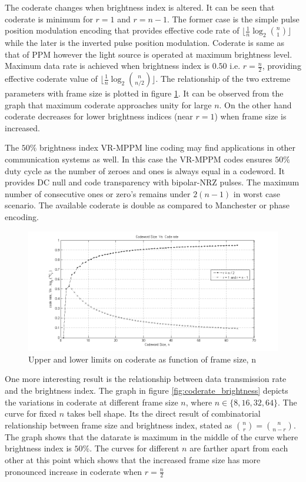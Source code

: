 The coderate changes when brightness index is altered. It can be seen that coderate is minimum for $r=1$ and $r=n-1$. The former case is the simple pulse position modulation encoding that provides effective code rate of $\lfloor \frac{1}{n} \log_2 \binom{n}{1} \rfloor$ while the later is the inverted pulse position modulation. Coderate is same as that of PPM however the light source is operated at maximum brightness level. Maximum data rate is achieved when brightness index is $0.50$ i.e. $r=\frac{n}{2}$, providing effective coderate value of $\lfloor \frac{1}{n} \log_2 \binom{n}{n/2} \rfloor$.  The relationship of the two extreme parameters with frame size is plotted in figure \ref{fig:coderate_limits}. It can be observed from the graph that maximum coderate approaches unity for large $n$. On the other hand coderate decreases for lower brightness indices (near $r=1$) when frame size is increased.

The $50\%$ brightness index VR-MPPM line coding may find applications in other communication systems as well. In this case the VR-MPPM codes ensures $50\%$ duty cycle as the number of zeroes and ones is always equal in a codeword. It provides DC null and code transparency with bipolar-NRZ pulses. The maximum number of consecutive ones or zero's remains under $2(n-1)$ in worst case scenario. The available coderate is double as compared to Manchester or phase encoding.

\begin{figure}[h]
	\centering
	\includegraphics[width=\textwidth]{./Figures/max_min_coderate.png}
	\caption[Coderate limits imposed by $n$]{Upper and lower limits on coderate as function of frame size, n}
	\label{fig:coderate_limits}
\end{figure}

One more interesting result is the relationship between data transmission rate and the brightness index. The graph in figure \ref{fig:coderate_brightness} depicts the variations in coderate at different frame size $n$, where $n \in \{8, 16, 32, 64 \}$. The curve for fixed $n$ takes bell shape. Its the direct result of combinatorial relationship between frame size and brightness index, stated as $\binom{n}{r}=\binom{n}{n-r}$. The graph shows that the datarate is maximum in the middle of the curve where brightness index is $50\%$. The curves for different $n$ are farther apart from each other at this point which shows that the increased frame size has more pronounced increase in coderate when $r=\frac{n}{2}$ 


